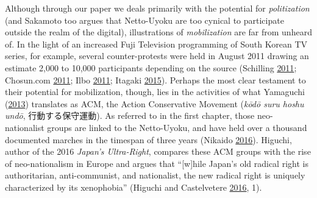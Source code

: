 \documentclass[10pt,british,A4paper,oneside]{memoir}
\begin{document}
Although through our paper we deals primarily with the potential for
\emph{politization} (and Sakamoto too argues that Netto-Uyoku are too
cynical to participate outside the realm of the digital), illustrations
of \emph{mobilization} are far from unheard of. In the light of an increased
Fuji Television programming of South Korean TV series, for example,
several counter-protests were held in August 2011 drawing an estimate
2,000 to 10,000 participants depending on the source (Schilling
\protect\hyperlink{ref-schilling_japanese_2011}{2011}; Chosun.com
\protect\hyperlink{ref-chosun.com_japanese_2011}{2011}; Ilbo
\protect\hyperlink{ref-the_donga_ilbo_japans_2011}{2011}; Itagaki
\protect\hyperlink{ref-itagaki_anatomy_2015}{2015}). Perhaps the most
clear testament to their potential for mobilization, though, lies
in the activities of what Yamaguchi
(\protect\hyperlink{ref-yamaguchi_xenophobia_2013}{2013}) translates as
ACM, the Action Conservative Movement (\emph{kōdō suru hoshu undō},
行動する保守運動). As referred to in the first chapter, those
neo-nationalist groups are linked to the Netto-Uyoku, and have held over
a thousand documented marches in the timespan of three years (Nikaido
\protect\hyperlink{ref-nikaido_eng:_2016}{2016}). Higuchi, author of the
2016 \emph{Japan's Ultra-Right}, compares these ACM groups with the rise
of neo-nationalism in Europe and argues that ``{[}w{]}hile Japan's old
radical right is authoritarian, anti-communist, and nationalist, the new
radical right is uniquely characterized by its xenophobia'' (Higuchi and
Castelvetere \protect\hyperlink{ref-higuchi_japans_2016}{2016}, 1).
\end{document}
